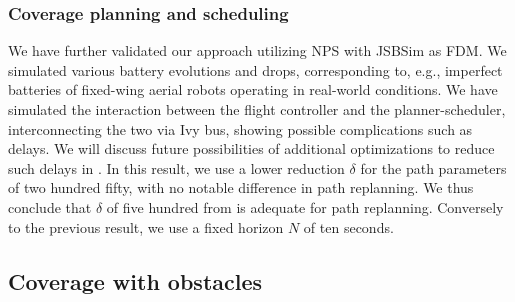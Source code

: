 \subsubsection*{Coverage planning and scheduling}

We have further validated our approach utilizing NPS with JSBSim as FDM. We simulated various battery evolutions and drops, corresponding to, e.g., imperfect batteries of fixed-wing aerial robots operating in real-world conditions. We have simulated the interaction between the flight controller and the planner-scheduler, interconnecting the two via Ivy bus, showing possible complications such as delays. We will discuss future possibilities of additional optimizations to reduce such delays in . In this result, we use a lower reduction $\delta$ for the path parameters of two hundred fifty, with no notable difference in path replanning. We thus conclude that $\delta$ of five hundred from  is adequate for path replanning. Conversely to the previous result, we use a fixed horizon $N$ of ten seconds.

\subsection{\color{red}Coverage with obstacles}
\label{sec:res-obsta}

